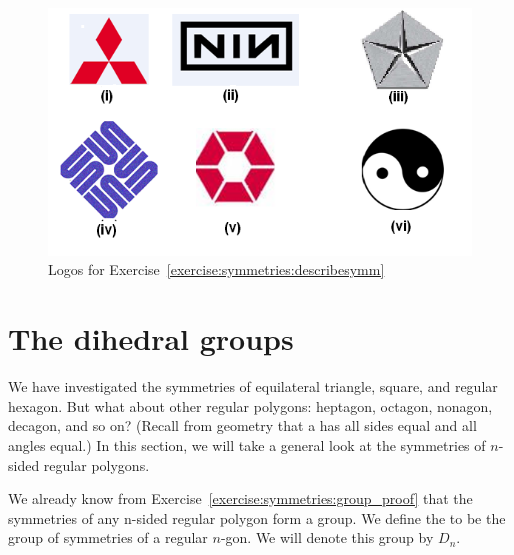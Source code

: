 \begin{figure}
\begin{center}
\includegraphics[scale=0.35]{images/logos.png}
\caption{Logos for Exercise~\ref{exercise:symmetries:describesymm}}
\label{logos}
\end{center}
\end{figure}

\section{The dihedral groups}\label{sec:dihedral}

We have investigated the symmetries of equilateral triangle, square, and regular hexagon. But what about other regular polygons: heptagon, octagon, nonagon, decagon, and so on?
(Recall from geometry that a  has all sides equal and all angles equal.)
In this section, we will  take a general look at the symmetries of $n$-sided regular polygons. 

We already know from Exercise~\ref{exercise:symmetries:group_proof} that the symmetries of any n-sided regular polygon form a group. We define the  to be the group of 
symmetries of a regular $n$-gon.
We will denote this group by
$D_n$\label{dihedralgroup}.  

